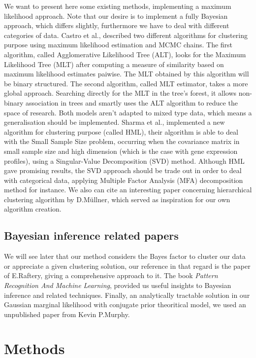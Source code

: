 \documentclass[twocolumn]{article}
\begin{document}
We want to present here some existing methods, implementing a maximum likelihood approach. Note that our desire is to implement a fully Bayesian approach, which differs slightly, furthermore we have to deal with different categories of data.
Castro et al.\cite{castro}, described two different algorithms for clustering purpose using maximum likelihood estimation and MCMC chains. The first algorithm, called Agglomerative Likelihood Tree (ALT), looks for the Maximum Likelihood Tree (MLT) after computing a measure of similarity based on maximum likelihood estimates paiwise.
The MLT obtained by this algorithm will be binary structured.
The second algorithm, called MLT estimator, takes a more global approach.
Searching directly for the MLT in the tree's forest, it allows non-binary association in trees and smartly uses the ALT algorithm to reduce the space of research. 
Both models aren't adapted to mixed type data, which means a generalisation should be implemented.
Sharma et al.\cite{sharma}, implemented a new algorithm for clustering purpose (called HML), their algorithm is able to deal with the Small Sample Size problem, occurring when the covariance matrix in small sample size and high dimension (which is the case with gene expression profiles), using a Singular-Value Decomposition (SVD) method.
Although HML gave promising results, the SVD approach should be trade out in order to deal with categorical data, applying Multiple Factor Analysis (MFA)\cite{pages} decomposition method for instance.
We also can cite an interesting paper concerning hierarchical clustering algorithm by D.Müllner\cite{mullner}, which served as inspiration for our own algorithm creation.

\subsection{Bayesian inference related papers}

We will see later that our method considers the Bayes factor to cluster our data or appreciate a given clustering solution, our reference in that regard is the paper of E.Raftery\cite{raftery}, giving a comprehensive approach to it.
The book \emph{Pattern Recognition And Machine Learning}\cite{bishop}, provided us useful insights to Bayesian inference and related techniques.
Finally, an analytically tractable solution in our Gaussian marginal likelihood with conjugate prior theoritical model, we used an unpublished paper from Kevin P.Murphy\cite{murphy}.

\section{Methods}
\end{document}
